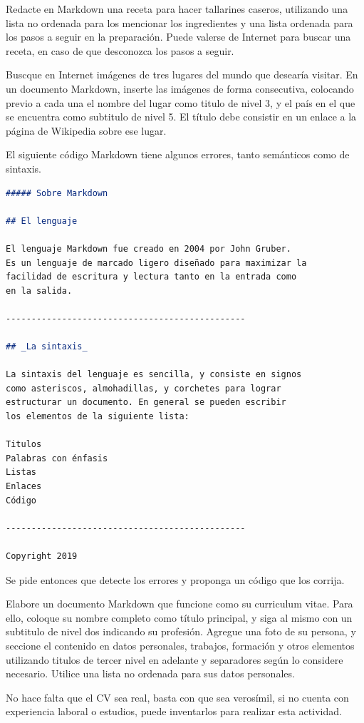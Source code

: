 \begin{exercise}
Redacte en Markdown una receta para hacer tallarines caseros, utilizando una
lista no ordenada para los mencionar los ingredientes y una lista ordenada para
los pasos a seguir en la preparación. Puede valerse de Internet para buscar una
receta, en caso de que desconozca los pasos a seguir.
\end{exercise}

\begin{exercise}
Buscque en Internet imágenes de tres lugares del mundo que desearía visitar.
En un documento Markdown, inserte las imágenes de forma consecutiva, colocando
previo a cada una el nombre del lugar como titulo de nivel 3, y el país en el
que se encuentra como subtitulo de nivel 5. El título debe consistir en un enlace
a la página de Wikipedia sobre ese lugar.
\end{exercise}

\begin{exercise}
El siguiente código Markdown tiene algunos errores, tanto semánticos como de
sintaxis.

\begin{minipage}{0.92\textwidth}
\begin{lstlisting}[language=Markdown]
##### Sobre Markdown

## El lenguaje

El lenguaje Markdown fue creado en 2004 por John Gruber.
Es un lenguaje de marcado ligero diseñado para maximizar la
facilidad de escritura y lectura tanto en la entrada como
en la salida.

-----------------------------------------------

## _La sintaxis_

La sintaxis del lenguaje es sencilla, y consiste en signos
como asteriscos, almohadillas, y corchetes para lograr
estructurar un documento. En general se pueden escribir
los elementos de la siguiente lista:

Titulos
Palabras con énfasis
Listas
Enlaces
Código

-----------------------------------------------

Copyright 2019
\end{lstlisting}
\end{minipage}

Se pide entonces que detecte los errores y proponga un código que los corrija.
\end{exercise}

\begin{exercise}
Elabore un documento Markdown que funcione como su curriculum vitae.
Para ello, coloque su nombre completo como título principal, y siga al mismo
con un subtitulo de nivel dos indicando su profesión. Agregue una foto de su persona,
y seccione el contenido en datos personales, trabajos, formación y otros elementos
utilizando titulos de tercer nivel en adelante y separadores según lo considere
necesario. Utilice una lista no ordenada para sus datos personales.

No hace falta que el CV sea real, basta con que sea verosímil, si no cuenta con
experiencia laboral o estudios, puede inventarlos para realizar esta actividad.
\end{exercise}

